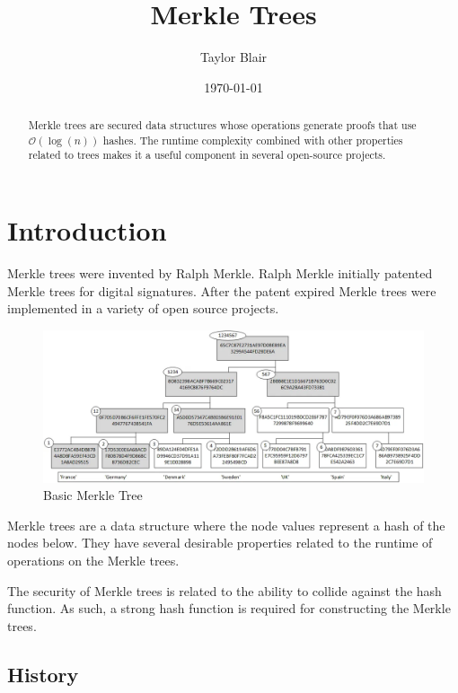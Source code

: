 \documentclass[12pt]{article}
\title{Merkle Trees}
\author{Taylor Blair}
\date{\today}
\begin{document}
\doublespacing
\maketitle



\begin{abstract}
	Merkle trees are secured data structures whose operations generate proofs that use $\mathcal{O}(\log(n))$ hashes. The runtime complexity combined with other properties related to trees makes it a useful component in several open-source projects.
\end{abstract}

\tableofcontents

\section{Introduction}

Merkle trees were invented by Ralph Merkle. Ralph Merkle initially patented Merkle trees for digital signatures. After the patent expired Merkle trees were implemented in a variety of open source projects. 

\begin{figure}[H]
	\centering
	\includegraphics[width=.8\textwidth]{../Images/merkle-example.png}
	\caption{Basic Merkle Tree\cite{wikipedia-merkle-tree}}
\end{figure}


Merkle trees are a data structure where the node values represent a hash of the nodes below. They have several desirable properties related to the runtime of operations on the Merkle trees.

The security of Merkle trees is related to the ability to collide against the hash function. As such, a strong hash function is required for constructing the Merkle trees. 


\subsection{History}
\end{document}
